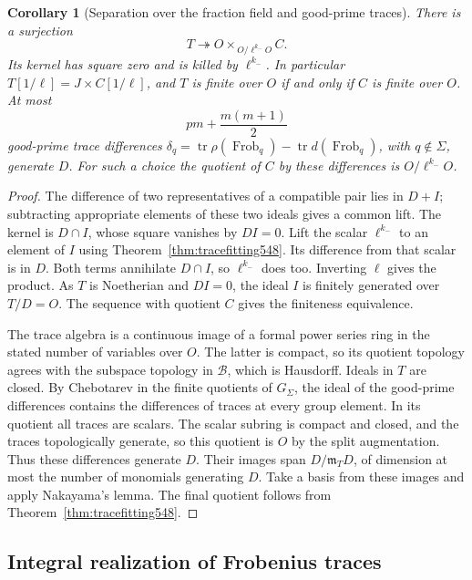 \documentclass[a4paper,11pt]{article}
\newtheorem{corollary}[proposition]{Corollary}
\theoremstyle{definition}
\theoremstyle{remark}
\numberwithin{equation}{section}
\begin{document}
\begin{corollary}[Separation over the fraction field and good-prime traces]
\leavevmode\label{cor:tracesplit548}
There is a surjection
\[
 T\twoheadrightarrow O\times_{\,O/\ell^{k_-}O} C .
\]
Its kernel has square zero and is killed by \(\ell^{k_-}\). In
particular \(T[1/\ell]=J\times C[1/\ell]\), and \(T\) is finite
over \(O\) if and only if \(C\) is finite over \(O\). At most
\[
        pm+\frac{m(m+1)}2
\]
good-prime trace differences \(\delta_q=\operatorname{tr}
\rho(\operatorname{Frob}_q)-\operatorname{tr}d(\operatorname{Frob}_q)\),
with \(q\notin\Sigma\), generate \(D\). For such a choice the
quotient of \(C\) by these differences is \(O/\ell^{k_-}O\).
\end{corollary}
\begin{proof}
The difference of two representatives of a compatible pair lies
in \(D+I\); subtracting appropriate elements of these two ideals
gives a common lift. The kernel is \(D\cap I\), whose square
vanishes by \(DI=0\). Lift the scalar \(\ell^{k_-}\) to an element
of \(I\) using Theorem~\ref{thm:tracefitting548}. Its difference
from that scalar is in \(D\). Both terms annihilate \(D\cap I\),
so \(\ell^{k_-}\) does too. Inverting \(\ell\) gives the product.
As \(T\) is Noetherian and \(DI=0\), the ideal \(I\) is finitely
generated over \(T/D=O\). The sequence with quotient \(C\)
gives the finiteness equivalence.

The trace algebra is a continuous image of a formal power series
ring in the stated number of variables over \(O\). The latter
is compact, so its quotient topology agrees with the subspace
topology in \(\mathcal B\), which is Hausdorff. Ideals in \(T\)
are closed. By Chebotarev in the finite quotients of \(G_\Sigma\),
the ideal of the good-prime differences contains the differences
of traces at every group element. In its quotient all traces are
scalars. The scalar subring is compact and closed, and the traces
topologically generate, so this quotient is \(O\) by the split
augmentation. Thus these differences generate \(D\). Their
images span \(D/\mathfrak m_TD\), of dimension at most the
number of monomials generating \(D\). Take a basis from these
images and apply Nakayama's lemma. The final quotient follows
from Theorem~\ref{thm:tracefitting548}.
\end{proof}


\subsection{Integral realization of Frobenius traces}
\label{sec:realizeall549}
\end{document}
